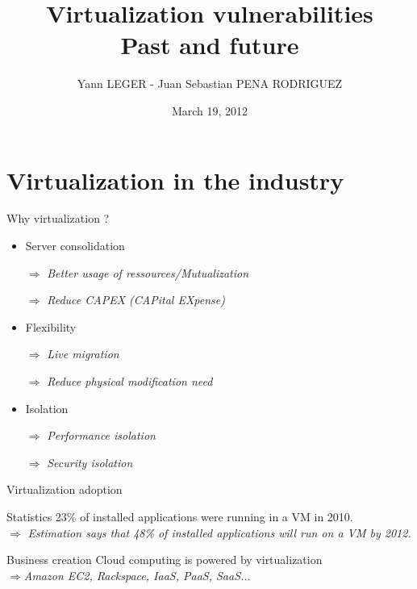 \documentclass{beamer}
\title[Virtualization vulnerabilites]{Virtualization vulnerabilities\\
Past and future}
\author{Yann LEGER - Juan Sebastian PENA RODRIGUEZ}
\institute{Epitech -- UCSD}
\date{March 19, 2012}
\begin{document}

\begin{frame}
\titlepage
\end{frame}

\section{Virtualization in the industry}
\begin{frame}{Why virtualization ?}
	\begin{itemize}
	\item Server consolidation
	\item[$\Rightarrow$] \emph{Better usage of ressources/Mutualization}\\
	\item[$\Rightarrow$] \emph{Reduce CAPEX (CAPital EXpense)}\\
	\item Flexibility
	\item[$\Rightarrow$] \emph{Live migration}\\
	\item[$\Rightarrow$] \emph{Reduce physical modification need}\\
	\item Isolation
	\item[$\Rightarrow$] \emph{Performance isolation}\\
	\item[$\Rightarrow$] \emph{\alert{Security isolation}}\\
	\end{itemize}
\end{frame}

\begin{frame}{Virtualization adoption}
	\begin{block}{Statistics}
		23\% of installed applications were running in a VM in 2010.\\
		$\Rightarrow$ \emph{Estimation says that 48\% of installed applications will run on a VM by 2012.}\\
	\end{block}
	\begin{block}{Business creation}
		Cloud computing is powered by virtualization\\
		$\Rightarrow$\emph{Amazon EC2, Rackspace, IaaS, PaaS, SaaS...}\\
	\end{block}
\end{frame}
\end{document}
